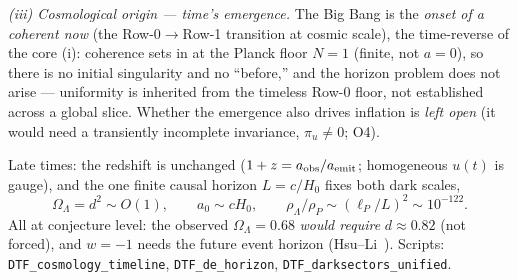 \documentclass[11pt]{article}
\begin{document}
\emph{(iii) Cosmological origin --- time's emergence.} The Big Bang is the \emph{onset of a coherent now} (the
Row-0$\to$Row-1 transition at cosmic scale), the time-reverse of the core (i): coherence sets in at the Planck
floor $N=1$ (finite, not $a=0$), so there is no initial singularity and no ``before,'' and the horizon problem
does not arise --- uniformity is inherited from the timeless Row-0 floor, not established across a global slice.
Whether the emergence also drives inflation is \emph{left open} (it would need a transiently incomplete
invariance, $\pi_u\neq0$; O4).

Late times: the redshift is unchanged ($1+z=a_{\rm obs}/a_{\rm emit}$; homogeneous $u(t)$ is gauge), and the
one finite causal horizon $L=c/H_0$ fixes both dark scales,
\[ \Omega_\Lambda=d^2\sim O(1), \qquad a_0\sim cH_0, \qquad \rho_\Lambda/\rho_P\sim(\ell_P/L)^2\sim10^{-122} . \]
All at conjecture level: the observed $\Omega_\Lambda=0.68$ \emph{would require} $d\approx0.82$ (not forced),
and $w=-1$ needs the future event horizon (Hsu--Li~\cite{Hsu2004,Li2004}). Scripts:
\texttt{DTF\_cosmology\_timeline}, \texttt{DTF\_de\_horizon}, \texttt{DTF\_darksectors\_unified}.

\end{document}
